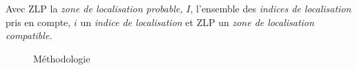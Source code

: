 Avec \textsf{ZLP} la \emph{zone de localisation probable,} \(I\),
l'ensemble des \emph{indices de localisation} pris en compte, \(i\) un
\emph{indice de localisation} et \textsf{ZLP} un \emph{zone de
  localisation compatible.}

\begin{landscape}
  \begin{figure}[H]
    \centering
    
    \caption{Méthodologie}
    \label{fig:methodo_1}
  \end{figure}
\end{landscape}


